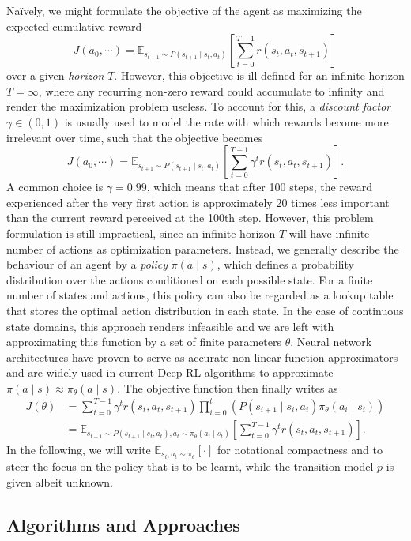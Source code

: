\documentclass[a4paper, 11pt]{article}
\begin{document}
	Na\"ively, we might formulate the objective of the agent as maximizing the expected cumulative reward 
	\[J(a_0,\cdots)=\mathbb{E}_{s_{t+1}\sim P(s_{t+1}\mid s_t,a_t)}\left[\sum_{t=0}^{T-1}r(s_t,a_t,s_{t+1})\right]\]
	over a given \textit{horizon} $T$. However, this objective is ill-defined for an infinite horizon $T=\infty$, where any recurring non-zero reward could accumulate to infinity and render the maximization problem useless. To account for this, a \textit{discount factor} $\gamma\in(0,1)$ is usually used to model the rate with which rewards become more irrelevant over time, such that the objective becomes
	\[J(a_0,\cdots)=\mathbb{E}_{s_{t+1}\sim P(s_{t+1}\mid s_t,a_t)}\left[\sum_{t=0}^{T-1}\gamma^t r(s_t,a_t,s_{t+1})\right].\] 
	A common choice is $\gamma=0.99$, which means that after 100 steps, the reward experienced after the very first action is approximately 20 times less important than the current reward perceived at the 100th step.
	However, this problem formulation is still impractical, since an infinite horizon $T$ will have infinite number of actions as optimization parameters. Instead, we generally describe the behaviour of an agent by a \textit{policy} $\pi(a\mid s)$, which defines a probability distribution over the actions conditioned on each possible state. 
	For a finite number of states and actions, this policy can also be regarded as a lookup table that stores the optimal action distribution in each state. In the case of continuous state domains, this approach renders infeasible and we are left with approximating this function by a set of finite parameters $\theta$.
	Neural network architectures have proven to serve as accurate non-linear function approximators and are widely used in current Deep RL algorithms to approximate $\pi(a\mid s)\approx \pi_\theta(a\mid s)$.
	The objective function then finally writes as
	\begin{align*}
		J(\theta)&=\sum_{t=0}^{T-1}\gamma^t r(s_t,a_t,s_{t+1})\prod_{i=0}^{t}\left(P(s_{i+1}\mid s_i,a_i)\pi_\theta(a_i\mid s_i)\right) \\
		&=\mathbb{E}_{s_{t+1}\sim P(s_{t+1}\mid s_t,a_t),a_t\sim \pi_\theta(a_t\mid s_t)}\left[\sum_{t=0}^{T-1}\gamma^t r(s_t,a_t,s_{t+1})\right].
	\end{align*}
	In the following, we will write $\mathbb{E}_{s_t,a_t\sim \pi_\theta}\left[\cdot \right]$ for notational compactness and to steer the focus on the policy that is to be learnt, while the transition model $p$ is given albeit unknown.
	\subsection{Algorithms and Approaches}
\end{document}
